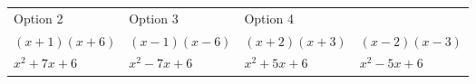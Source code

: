 {{\begin{center}
\begin{xtabular}[t]{|l|l|l|l|}
        Option 2 &
        Option 3 &
        Option 4%
     \tabularnewline{}
                $\left(x+1\right)\left(x+6\right)$
               &
                $\left(x-1\right)\left(x-6\right)$
               &
                $\left(x+2\right)\left(x+3\right)$
               &
                $\left(x-2\right)\left(x-3\right)$
     \tabularnewline{}
                ${x}^{2}+7x+6$
               &
                ${x}^{2}-7x+6$
               &
                \uline{
                  ${x}^{2}+5x+6$
                }
               &
                ${x}^{2}-5x+6$

\end{xtabular}
\end{center}}}
